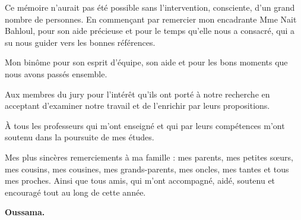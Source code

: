 \begin{acknowledgement}


Ce mémoire n'aurait pas été possible sans l'intervention, consciente, d'un grand nombre de personnes.
En commençant par remercier mon encadrante Mme Nait Bahloul, pour son aide précieuse et pour le temps qu'elle nous a consacré, qui a su nous guider vers les bonnes références.

Mon binôme pour son esprit d'équipe, son aide et pour les bons moments que nous avons passés ensemble.

Aux membres du jury pour l'intérêt qu'ils ont porté à notre recherche en acceptant d'examiner notre travail et de l'enrichir par leurs propositions.

À tous les professeurs qui m'ont enseigné et qui par leurs compétences m'ont soutenu dans la poursuite de mes études.

Mes plus sincères remerciements à ma famille : mes parents, mes petites sœurs, mes cousins, mes cousines, mes grands-parents, mes oncles, mes tantes et tous mes proches. Ainsi que tous amis, qui m'ont accompagné, aidé, soutenu et encouragé tout au long de cette année.

%



\begin{flushright}
\textbf{Oussama.}
\end{flushright}
\end{acknowledgement}

\clearpage